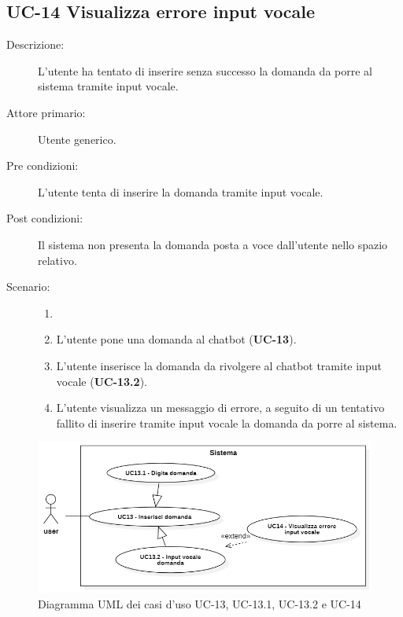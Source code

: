\subsection{UC-14 Visualizza errore input vocale}
\begin{description}
    \item[Descrizione:] L'utente ha tentato di inserire senza successo la domanda da porre al sistema tramite input vocale.
    \item[Attore primario:] Utente generico.
    \item[Pre condizioni:] L'utente tenta di inserire la domanda tramite input vocale.
    \item[Post condizioni:] Il sistema non presenta la domanda posta a voce dall'utente nello spazio relativo.
    \item[Scenario:] 
    \begin{enumerate}
        \item[]
        \item L’utente pone una domanda al chatbot (\textbf{UC-13}).
        \item L'utente inserisce la domanda da rivolgere al chatbot tramite input vocale (\textbf{UC-13.2}).
        \item L'utente visualizza un messaggio di errore, a seguito di un tentativo fallito di inserire tramite input vocale la domanda da porre al sistema.
    \end{enumerate}
\end{description}

\begin{figure}[H]
    \centering
    \includegraphics[width=\linewidth]{UC13-14.png} %
    \caption{Diagramma UML dei casi d'uso UC-13, UC-13.1, UC-13.2 e UC-14}
    \label{fig:UC16-17}
\end{figure}


